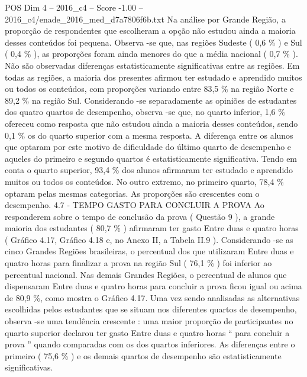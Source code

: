 \begin{textsample}{POS Dim 4 – 2016\_c4 – Score -1.00 – 2016\_c4/enade\_2016\_med\_d7a7806f6b.txt}
Na análise por Grande Região, a proporção de respondentes que escolheram a opção não estudou ainda a maioria desses conteúdos foi pequena.
Observa -se que, nas regiões Sudeste ( 0,6 \% ) e Sul ( 0,4 \% ), as proporções foram ainda menores do que a média nacional ( 0,7 \% ).
Não são observadas diferenças estatisticamente significativas entre as regiões.
Em todas as regiões, a maioria dos presentes afirmou ter estudado e aprendido muitos ou todos os conteúdos, com proporções variando entre 83,5 \% na região Norte e 89,2 \% na região Sul.
Considerando -se separadamente as opiniões de estudantes dos quatro quartos de desempenho, observa -se que, no quarto inferior, 1,6 \% ofereceu como resposta que não estudou ainda a maioria desses conteúdos, sendo 0,1 \% os do quarto superior com a mesma resposta.
A diferença entre os alunos que optaram por este motivo de dificuldade do último quarto de desempenho e aqueles do primeiro e segundo quartos é estatisticamente significativa.
Tendo em conta o quarto superior, 93,4 \% dos alunos afirmaram ter estudado e aprendido muitos ou todos os conteúdos.
No outro extremo, no primeiro quarto, 78,4 \% optaram pelas mesmas categorias.
As proporções são crescentes com o desempenho. 4.7 - TEMPO GASTO PARA CONCLUIR A PROVA Ao responderem sobre o tempo de conclusão da prova ( Questão 9 ), a grande maioria dos estudantes ( 80,7 \% ) afirmaram ter gasto Entre duas e quatro horas ( Gráfico 4.17, Gráfico 4.18 e, no Anexo II, a Tabela II.9 ).
Considerando -se as cinco Grandes Regiões brasileiras, o percentual dos que utilizaram Entre duas e quatro horas para finalizar a prova na região Sul ( 76,1 \% ) foi inferior ao percentual nacional.
Nas demais Grandes Regiões, o percentual de alunos que dispensaram Entre duas e quatro horas para concluir a prova ficou igual ou acima de 80,9 \%, como mostra o Gráfico 4.17.
Uma vez sendo analisadas as alternativas escolhidas pelos estudantes que se situam nos diferentes quartos de desempenho, observa -se uma tendência crescente : uma maior proporção de participantes no quarto superior declarou ter gasto Entre duas e quatro horas “ para concluir a prova ” quando comparadas com os dos quartos inferiores.
As diferenças entre o primeiro ( 75,6 \% ) e os demais quartos de desempenho são estatisticamente significativas.

\end{textsample}
